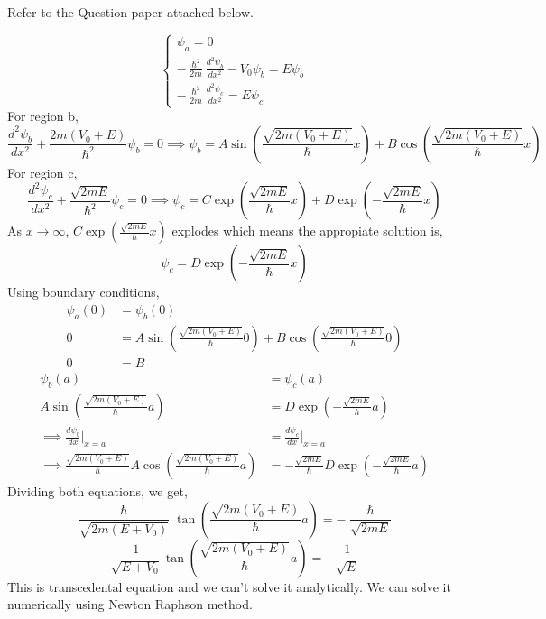 \documentclass[addpoints]{exam}
\begin{document}
\begin{questions}
    \pagebreak
    \question Refer to the Question paper attached below.
    \begin{solution}
        \[
            \begin{cases}
                \psi_a = 0                                                                 \\
                \displaystyle-\frac{\hslash^2}{2m}\frac{d^2\psi_b}{dx^2}-V_0\psi_b=E\psi_b \\
                \displaystyle-\frac{\hslash^2}{2m}\frac{d^2\psi_c}{dx^2}=E\psi_c
            \end{cases}
        \]
        For region b,
        \[\frac{d^2\psi_b}{dx^2}+\frac{2m(V_0+E)}{\hslash^2}\psi_b=0 \implies \psi_b=A\sin\left(\frac{\sqrt{2m(V_0+E)}}{\hslash}x\right)+B\cos\left(\frac{\sqrt{2m(V_0+E)}}{\hslash}x\right)\]
        For region c,
        \[\frac{d^2\psi_c}{dx^2}+\frac{\sqrt{2mE}}{\hslash^2}\psi_c=0\implies\psi_c=C\exp{\left(\frac{\sqrt{2mE}}{\hslash}x\right)}+D\exp{\left(-\frac{\sqrt{2mE}}{\hslash}x\right)}\]
        As \(x\rightarrow\infty\), \(C\exp{\left(\frac{\sqrt{2mE}}{\hslash}x\right)}\) explodes which means the appropiate solution is,
        \[\psi_c=D\exp{\left(-\frac{\sqrt{2mE}}{\hslash}x\right)}\]
        Using boundary conditions,
        \begin{align*}
            \psi_a(0) & = \psi_b(0)                                                                                               \\
            0         & = A\sin\left(\frac{\sqrt{2m(V_0+E)}}{\hslash}0\right)+B\cos\left(\frac{\sqrt{2m(V_0+E)}}{\hslash}0\right) \\
            0         & = B
        \end{align*}
        \begin{align*}
            \psi_b(a)                                                                                      & = \psi_c(a)                                                                   \\
            A\sin{\left(\frac{\sqrt{2m(V_0+E)}}{\hslash}a\right)}                                          & = D\exp{\left(-\frac{\sqrt{2mE}}{\hslash}a\right)}                            \\
            \implies \frac{d\psi_b}{dx}\bigg|_{x=a}                                                        & = \frac{d\psi_c}{dx}\bigg|_{x=a}                                              \\
            \implies \frac{\sqrt{2m(V_0+E)}}{\hslash}A\cos{\left(\frac{\sqrt{2m(V_0+E)}}{\hslash}a\right)} & = -\frac{\sqrt{2mE}}{\hslash}D\exp{\left(-\frac{\sqrt{2mE}}{\hslash}a\right)}
        \end{align*}
        Dividing both equations, we get,
        \[\frac{\hslash}{\sqrt{2m(E+V_0)}}\tan{\left(\frac{\sqrt{2m(V_0+E)}}{\hslash}a\right)}=-\frac{\hslash}{\sqrt{2mE}}\]
        \[\frac{1}{\sqrt{E+V_0}}\tan{\left(\frac{\sqrt{2m(V_0+E)}}{\hslash}a\right)}=-\frac{1}{\sqrt{E}}\]
        This is transcedental equation and we can't solve it analytically. We can solve it numerically using Newton Raphson method.
    \end{solution}



\end{questions}
\end{document}
